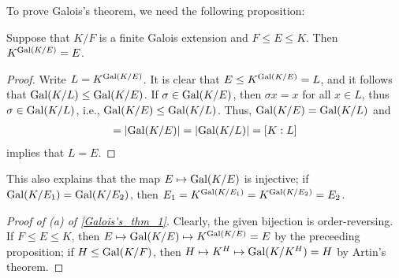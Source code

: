 To prove Galois's theorem, we need the following proposition:
\begin{prop}
    Suppose that $K/F$ is a finite Galois extension and $F\leq E\leq K$.
    Then $K^{{\textrm{Gal}({K/E})}}=E$.
\end{prop}
\begin{proof}
    Write $L=K^{\textrm{Gal}({K/E})}$.
    It is clear that $E\leq K^{\textrm{Gal}({K/E})}=L$, and it follows that ${\textrm{Gal}({K/L})}\leq{\textrm{Gal}({K/E})}$.
    If $\sigma\in{\textrm{Gal}({K/E})}$, then $\sigma x=x$ for all $x\in L$, thus $\sigma\in{\textrm{Gal}({K/L})}$, i.e., ${\textrm{Gal}({K/E})}\leq{\textrm{Gal}({K/L})}$.
    Thus, ${\textrm{Gal}({K/E})}={\textrm{Gal}({K/L})}$ and
    \begin{align*}
        [K:E]=|\gal{K/E}|=|\gal{K/L}|=[K:L]
    \end{align*}
    implies that $L=E$.
\end{proof}
\begin{rmk}
    This also explains that the map $E\mapsto{\textrm{Gal}({K/E})}$ is injective; if ${\textrm{Gal}({K/E_1})}={\textrm{Gal}({K/E_2})}$, then $E_1=K^{{\textrm{Gal}({K/E_1})}}=K^{{\textrm{Gal}({K/E_2})}}=E_2$.
\end{rmk}
\begin{proof}[Proof of (a) of \cref{Galois's_thm_1}]
    Clearly, the given bijection is order-reversing.
    If $F\leq E\leq K$, then $E\mapsto{\textrm{Gal}({K/E})}\mapsto K^{\textrm{Gal}({K/E})}=E$ by the preceeding proposition; if $H\leq{\textrm{Gal}({K/F})}$, then $H\mapsto K^H\mapsto{\textrm{Gal}({K/K^H})}=H$ by Artin's theorem.
\end{proof}

